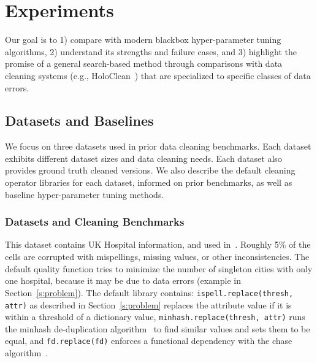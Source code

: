 \section{Experiments}\label{s:exp}
Our goal is to 1) compare \sys with modern blackbox hyper-parameter tuning algorithms, 2) understand its strengths and failure cases, and 3) highlight the promise of a general search-based method through comparisons with data cleaning systems (e.g., HoloClean~\cite{rekatsinas2017holoclean}) that are specialized to specific classes of data errors. 




\subsection{Datasets and Baselines}
We focus on three datasets used in prior data cleaning benchmarks.  Each dataset exhibits different dataset sizes and data cleaning needs. Each dataset also provides ground truth cleaned versions. We also describe the default cleaning operator libraries for each dataset, informed on prior benchmarks, as well as baseline hyper-parameter tuning methods.

\subsubsection{Datasets and Cleaning Benchmarks}


 This dataset contains UK Hospital information, and used in~\cite{he2016interactive, rekatsinas2017holoclean}.  Roughly 5\% of the cells are corrupted with mispellings, missing values, or other inconsistencies.  The default quality function tries to minimize the number of singleton cities with only one hospital, because it may be due to data errors (example in Section~\ref{s:problem}).  The default library contains: \texttt{ispell.replace(thresh, attr)} as described in Section~\ref{s:problem} replaces the attribute value if it is within a threshold of a dictionary value, \texttt{minhash.replace(thresh, attr)} runs the minhash de-duplication algorithm~\cite{broder2000min} to find similar values and sets them to be equal, and \texttt{fd.replace(fd)} enforces a functional dependency with the chase algorithm~\cite{aho1979theory}.

